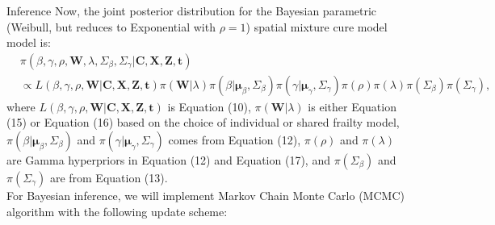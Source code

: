 \documentclass[a4paper, 12pt]{article}
\makeatletter
\renewcommand{\section}{\@startsection
	{section}    {1}    {0mm}    {-0.7\baselineskip}    {0.08\baselineskip}    {\normalfont\large\sc\center\bf}}
\makeatother
\begin{document}
\section{Inference}
\noindent Now, the joint posterior distribution for the Bayesian parametric (Weibull, but reduces to Exponential with $\rho = 1$) spatial mixture cure model model is:
\begin{equation}
\begin{aligned}
&\pi({\beta}, \gamma, \rho, \mathbf{W}, \lambda, \Sigma_{\beta}, \Sigma_{\gamma}|\mathbf{C}, \mathbf{X}, \mathbf{Z}, \mathbf{t}) \\&\propto L({\beta}, \gamma, \rho, \mathbf{W}|\mathbf{C}, \mathbf{X}, \mathbf{Z}, \mathbf{t})\pi(\mathbf{W}|\lambda)  \pi({\beta}|\mathbf{\mu}_{\beta}, \Sigma_{\beta}) \pi({\gamma}|\mathbf{\mu}_{\gamma}, \Sigma_{\gamma})  \pi(\rho)\pi(\lambda) \pi(\Sigma_{\beta})  \pi(\Sigma_{\gamma}),
\end{aligned}
\end{equation}
where $L({\beta}, \gamma, \rho, \mathbf{W}|\mathbf{C}, \mathbf{X}, \mathbf{Z}, \mathbf{t})$ is Equation (10), $\pi(\mathbf{W}|\lambda)$ is either Equation (15) or Equation (16) based on the choice of individual or shared frailty model, $\pi({\beta}|\mathbf{\mu}_{\beta}, \Sigma_{\beta})$ and  $\pi({\gamma}|\mathbf{\mu}_{\gamma}, \Sigma_{\gamma})$ comes from Equation (12), $\pi(\rho)$ and $\pi(\lambda)$ are Gamma hyperpriors in Equation (12) and Equation (17), and $\pi(\Sigma_{\beta})$ and $\pi(\Sigma_{\gamma})$ are from Equation (13).\\ \newline
For Bayesian inference, we will implement Markov Chain Monte Carlo (MCMC) algorithm with the following update scheme:
\end{document}
